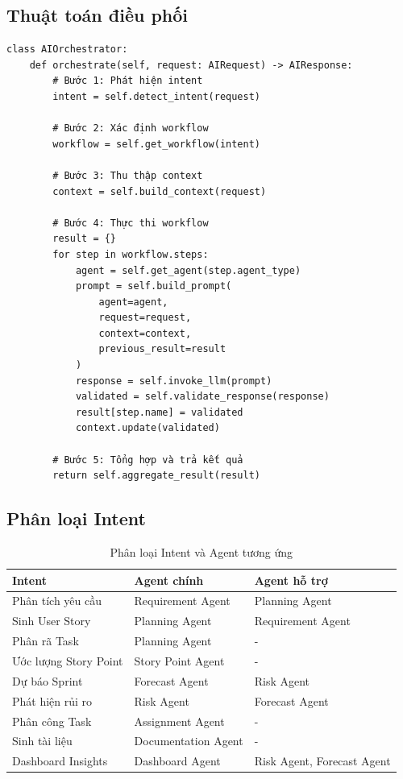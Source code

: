 \documentclass[12pt,a4paper]{report}
\begin{document}
\subsection{Thuật toán điều phối}

\begin{verbatim}
class AIOrchestrator:
    def orchestrate(self, request: AIRequest) -> AIResponse:
        # Bước 1: Phát hiện intent
        intent = self.detect_intent(request)

        # Bước 2: Xác định workflow
        workflow = self.get_workflow(intent)

        # Bước 3: Thu thập context
        context = self.build_context(request)

        # Bước 4: Thực thi workflow
        result = {}
        for step in workflow.steps:
            agent = self.get_agent(step.agent_type)
            prompt = self.build_prompt(
                agent=agent,
                request=request,
                context=context,
                previous_result=result
            )
            response = self.invoke_llm(prompt)
            validated = self.validate_response(response)
            result[step.name] = validated
            context.update(validated)

        # Bước 5: Tổng hợp và trả kết quả
        return self.aggregate_result(result)
\end{verbatim}

\subsection{Phân loại Intent}

\begin{table}[H]
\centering
\caption{Phân loại Intent và Agent tương ứng}
\begin{tabular}{|p{4.5cm}|p{4.5cm}|p{5.5cm}|}
\hline
\textbf{Intent} & \textbf{Agent chính} & \textbf{Agent hỗ trợ} \\
\hline
Phân tích yêu cầu & Requirement Agent & Planning Agent \\
\hline
Sinh User Story & Planning Agent & Requirement Agent \\
\hline
Phân rã Task & Planning Agent & - \\
\hline
Ước lượng Story Point & Story Point Agent & - \\
\hline
Dự báo Sprint & Forecast Agent & Risk Agent \\
\hline
Phát hiện rủi ro & Risk Agent & Forecast Agent \\
\hline
Phân công Task & Assignment Agent & - \\
\hline
Sinh tài liệu & Documentation Agent & - \\
\hline
Dashboard Insights & Dashboard Agent & Risk Agent, Forecast Agent \\
\hline
\end{tabular}
\label{tab:intent_mapping}
\end{table}
\end{document}
